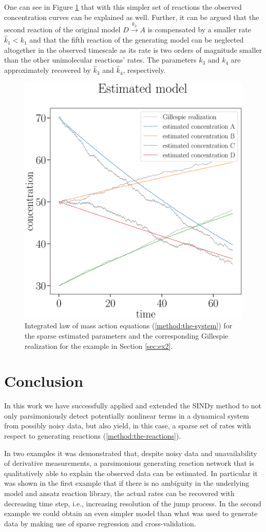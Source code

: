 \documentclass[oneside, abstracton, titlepage]{scrartcl}
\begin{document}
	One can see in Figure \ref{ex2:result} that with this simpler set of reactions the observed concentration curves can be explained as well. Further, it can be argued that the second reaction of the original model $D\xrightarrow{k_2}A$ is compensated by a smaller rate $\hat{k}_1 < k_1$ and that the fifth reaction of the generating model can be neglected altogether in the observed timescale as its rate is two orders of magnitude smaller than the other unimolecular reactions' rates.
	The parameters $k_3$ and $k_4$ are approximately recovered by $\hat{k}_3$ and $\hat{k}_4$, respectively.
	
	\begin{figure}
		\begin{center}
			\includegraphics[width=.5\textwidth]{./figures_tex/cv_expected_estimated_concentrations}
		\end{center}
		\caption{Integrated law of mass action equations (\ref{method:the-system}) for the sparse estimated parameters and the corresponding Gillespie realization for the example in Section \ref{sec:ex2}.}
		\label{ex2:result}
	\end{figure}
	
	\section{Conclusion}
	In this work we have successfully applied and extended the SINDy method to not only parsimoniously detect potentially nonlinear terms in a dynamical system from possibly noisy data, but also yield, in this case, a sparse set of rates with respect to generating reactions (\ref{method:the-reactions}).
	
	In two examples it was demonstrated that, despite noisy data and unavailability of derivative measurements, a parsimonious generating reaction network that is qualitatively able to explain the observed data can be estimated. 
	In particular it was shown in the first example that if there is no ambiguity in the underlying model and ansatz reaction library, the actual rates can be recovered with decreasing time step, i.e., increasing resolution of the jump process. 
	In the second example we could obtain an even simpler model than what was used to generate data by making use of sparse regression and cross-validation.
	
	\newpage
% 	
	
	
	
\end{document}
